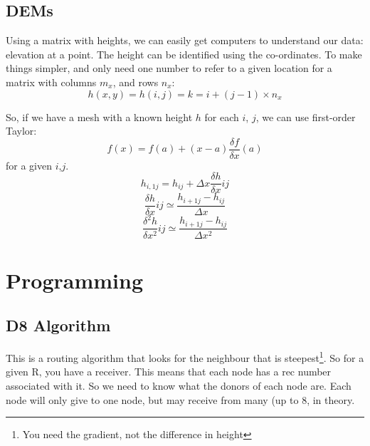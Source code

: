 \subsection{DEMs}
Using a matrix with heights, we can easily get computers to understand our data: elevation at a point.
The height can be identified using the co-ordinates. To make things simpler, and only need one number to refer to a given location for a matrix with columns $m_x$, and rows $n_x$:
\[
h(x,y) = h(i,j) = k = i + (j-1) \times n_x
\]

So, if we have a mesh with a known height $h$ for each $i$, $j$, we can use first-order Taylor:
\[
f(x) = f(a) + (x-a)\frac{\delta f}{\delta x}(a)
\]
for a given $i$,$j$.
\[
h_{i,1j} = h_{ij} + \Delta x \frac{\delta h}{\delta x} ij
\]
\[
\frac{\delta h}{\delta x}ij \simeq \frac{h_{i+1j} - h_{ij}}{\Delta x}
\]
\[
\frac{\delta^2 h}{\delta x^2}ij \simeq \frac{h_{i+1j} - h_{ij}}{\Delta x^2}
\]

\section{Programming}
\subsection{D8 Algorithm}
This is a routing algorithm that looks for the neighbour that is steepest\footnote{You need the gradient, not the difference in height}.
So for a given R, you have a receiver. This means that each node has a rec number associated with it. So we need to know what the donors of each node are. Each node will only give to one node, but may receive from many (up to 8, in theory. 
